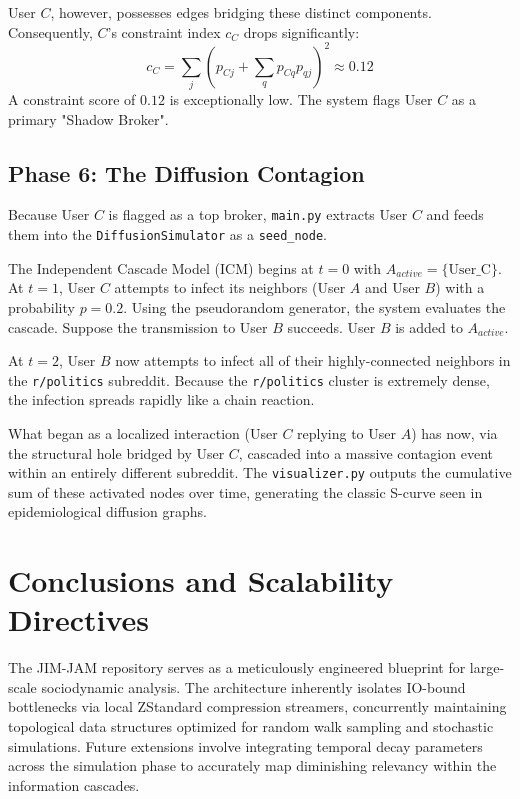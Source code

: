\documentclass[12pt,a4paper]{report}
\begin{document}
User $C$, however, possesses edges bridging these distinct components. Consequently, $C$'s constraint index $c_C$ drops significantly:
\begin{equation}
    c_C = \sum_{j} \left( p_{Cj} + \sum_{q} p_{Cq} p_{qj} \right)^2 \approx 0.12
\end{equation}
A constraint score of $0.12$ is exceptionally low. The system flags User $C$ as a primary "Shadow Broker".

\section{Phase 6: The Diffusion Contagion}
Because User $C$ is flagged as a top broker, \texttt{main.py} extracts User $C$ and feeds them into the \texttt{DiffusionSimulator} as a \texttt{seed\_node}.

The Independent Cascade Model (ICM) begins at $t=0$ with $A_{active} = \{\text{User\_C}\}$.
At $t=1$, User $C$ attempts to infect its neighbors (User $A$ and User $B$) with a probability $p=0.2$.
Using the pseudorandom generator, the system evaluates the cascade. Suppose the transmission to User $B$ succeeds. User $B$ is added to $A_{active}$.

At $t=2$, User $B$ now attempts to infect all of their highly-connected neighbors in the \texttt{r/politics} subreddit. Because the \texttt{r/politics} cluster is extremely dense, the infection spreads rapidly like a chain reaction. 

What began as a localized interaction (User $C$ replying to User $A$) has now, via the structural hole bridged by User $C$, cascaded into a massive contagion event within an entirely different subreddit. The \texttt{visualizer.py} outputs the cumulative sum of these activated nodes over time, generating the classic S-curve seen in epidemiological diffusion graphs.

\chapter{Conclusions and Scalability Directives}
The JIM-JAM repository serves as a meticulously engineered blueprint for large-scale sociodynamic analysis. The architecture inherently isolates IO-bound bottlenecks via local ZStandard compression streamers, concurrently maintaining topological data structures optimized for random walk sampling and stochastic simulations. Future extensions involve integrating temporal decay parameters across the simulation phase to accurately map diminishing relevancy within the information cascades.
\end{document}
